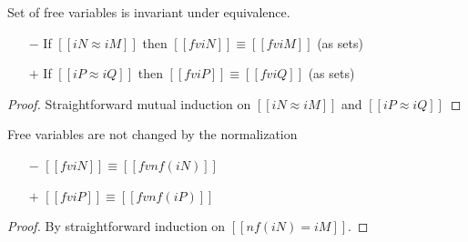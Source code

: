 \begin{lemma}
  \label{lemma:equiv-fv}
  Set of free variables is invariant under equivalence.
  \begin{itemize}
  \item[$-$] If $[[iN ≈ iM]]$ then $[[fv iN]] \equiv [[fv iM]]$ (as sets)
  \item[$+$] If $[[iP ≈ iQ]]$ then $[[fv iP]] \equiv [[fv iQ]]$ (as sets)
  \end{itemize}
\end{lemma}
\begin{proof}
  Straightforward mutual induction on $[[iN ≈ iM]]$ and $[[iP ≈ iQ]]$
\end{proof}


\begin{lemma}
  \label{lemma:fv-nf}
  Free variables are not changed by the normalization
  \begin{itemize}
  \item[$-$] $[[fv iN]] \equiv [[fv nf(iN)]]$
  \item[$+$] $[[fv iP]] \equiv [[fv nf(iP)]]$
  \end{itemize}
\end{lemma}
\begin{proof}
  By straightforward induction on $[[nf(iN) = iM]]$.
\end{proof}

